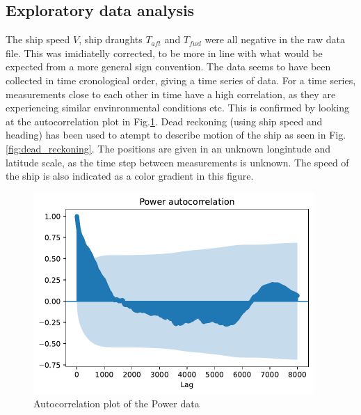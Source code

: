 \subsection*{Exploratory data analysis}\label{exploratory-data-analysis}
The ship speed $V$, ship draughts $T_{aft}$ and $T_{fwd}$ were all
negative in the raw data file. This was imidiatelly corrected, to be
more in line with what would be expected from a more general sign
convention. The data seems to have been collected in time cronological
order, giving a time series of data. For a time series, measurements
close to each other in time have a high correlation, as they are
experiencing similar envinronmental conditions etc. This is confirmed by
looking at the autocorrelation plot in
Fig.\ref{fig:power_autocorrelation}. Dead reckoning (using ship
speed and heading) has been used to atempt to describe motion of the
ship as seen in Fig.\ref{fig:dead_reckoning}. The positions are
given in an unknown longintude and latitude scale, as the time step
between measurements is unknown. The speed of the ship is also indicated
as a color gradient in this figure.
\begin{figure}[H]
\begin{center}\includegraphics[width = 0.95\textwidth]{figures/power_autocorrelation.pdf}\end{center}
\vspace{-0.7cm}
\caption{Autocorrelation plot of the Power data}
\label{fig:power_autocorrelation}
\end{figure}
